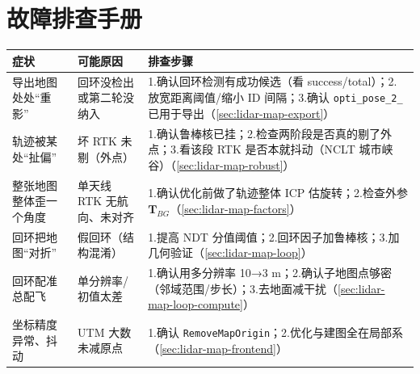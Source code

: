 \section*{故障排查手册}
\begin{table}[H]\centering\small
\begin{tabular}{p{} p{} p{}}
\toprule
症状 & 可能原因 & 排查步骤 \\
\midrule
导出地图处处“重影” & 回环没检出或第二轮没纳入 & 1.确认回环检测有成功候选（看 success/total）；2.放宽距离阈值/缩小 ID 间隔；3.确认 \texttt{opti\_pose\_2\_} 已用于导出（\cref{sec:lidar-map-export}）\\
轨迹被某处“扯偏” & 坏 RTK 未剔（外点） & 1.确认鲁棒核已挂；2.检查两阶段是否真的剔了外点；3.看该段 RTK 是否本就抖动（NCLT 城市峡谷）（\cref{sec:lidar-map-robust}）\\
整张地图整体歪一个角度 & 单天线 RTK 无航向、未对齐 & 1.确认优化前做了轨迹整体 ICP 估旋转；2.检查外参 $\mathbf{T}_{BG}$（\cref{sec:lidar-map-factors}）\\
回环把地图“对折” & 假回环（结构混淆） & 1.提高 NDT 分值阈值；2.回环因子加鲁棒核；3.加几何验证（\cref{sec:lidar-map-loop}）\\
回环配准总配飞 & 单分辨率/初值太差 & 1.确认用多分辨率 10→3 m；2.确认子地图点够密（邻域范围/步长）；3.去地面减干扰（\cref{sec:lidar-map-loop-compute}）\\
坐标精度异常、抖动 & UTM 大数未减原点 & 1.确认 \texttt{RemoveMapOrigin}；2.优化与建图全在局部系（\cref{sec:lidar-map-frontend}）\\
\bottomrule
\end{tabular}
\end{table}

